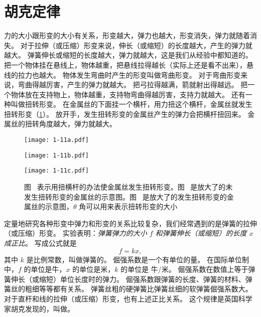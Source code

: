 \section{胡克定律}
力的大小跟形变的大小有关系，形变越大，弹力也越大，形变消失，弹力就随着消失。
对于拉伸（或压缩）形变来说，伸长（或缩短）的长度越大，产生的弹力就越大。
弹簧伸长或缩短的长度越大，弹力就越大，这是我们从经验中都知道的。
把一个物体挂在悬线上，物体越重，把悬线拉得越长（实际上还是看不出来），悬线的拉力也越大。
物体发生弯曲时产生的形变叫做弯曲形变。
对于弯曲形变来说，弯曲得越厉害，产生的弹力就越大。
把弓拉得越满，箭就射出得越远。
把一个物体放在支持物上，物体越重，支持物弯曲得越厉害，支持力就越大。
还有一种叫做扭转形变。
在金属丝的下面挂一个横杆，用力扭这个横杆，金属丝就发生扭转形变（\cref{fig:1-11}）。
放开手，发生扭转形变的金属丝产生的弹力会把横杆扭回来。
金属丝的扭转角度越大，弹力就越大。

\begin{figure}
  \begin{minipage}{0.4\linewidth}\centering
    \texttt{[image: 1-11a.pdf]}
    \subcaption{}\label{fig:11a}
  \end{minipage}
  \begin{minipage}{0.2\linewidth}\centering
    \texttt{[image: 1-11b.pdf]}
    \subcaption{}\label{fig:11b}
  \end{minipage}
  \begin{minipage}{0.2\linewidth}\centering
    \texttt{[image: 1-11c.pdf]}
    \subcaption{}\label{fig:11c}
  \end{minipage}
  \begin{minipage}{0.9\linewidth}
    \footnotesize 图~ 表示用扭横杆的办法使金属丝发生扭转形变。图~ 是放大了的未发生扭转形变的金属丝的示意图。图~ 是放大了的发生扭转形变的金属丝的示意图，$\theta$ 角可以用来表示扭转形变的大小
  \end{minipage}
\caption{}\label{fig:1-11}
\end{figure}

定量地研究各种形变中弹力和形变的关系比较复杂，我们经常遇到的是弹簧的拉伸（或压缩）形变。
实验表明：\emph{弹簧弹力的大小 $f$ 和弹簧伸长（或缩短）的长度 $x$ 成正比}。
写成公式就是
\[f=kx,\]
其中 $k$ 是比例常数，叫做弹簧的。
倔强系数是一个有单位的量。
在国际单位制中，$f$ 的单位是牛，$x$ 的单位是米，$k$ 的单位是 
牛/米。
倔强系数在数值上等于弹簧伸长（或缩短）单位长度时的弹力。
倔强系数跟弹簧的长度、弹簧的材料、弹簧丝的粗细等等都有关系。
弹簧丝粗的硬弹簧比弹簧丝细的软弹簧倔强系数大。
对于直杆和线的拉伸（或压缩）形变，也有上述正比关系。
这个规律是英国科学家胡克发现的，叫做。

